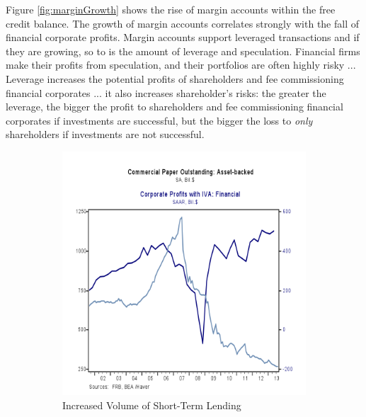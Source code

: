 Figure \ref{fig:marginGrowth} shows the rise of margin accounts within the free credit balance.  The growth of margin accounts correlates strongly with the fall of financial corporate profits.  Margin accounts support leveraged transactions and if they are growing, so to is the amount of leverage and speculation.  Financial firms make their profits from speculation, and their portfolios are often highly risky ... Leverage increases the potential profits of shareholders and fee commissioning financial corporates ... it also increases shareholder's risks: the greater the leverage, the bigger the profit to shareholders and fee commissioning financial corporates if investments are successful, but the bigger the loss to \textit{only} shareholders if investments are not successful.\cite{Dowd}  

 
\begin{figure}[H]
\centering
\begin{subfigure}{.5\textwidth}
  \centering
  \includegraphics[width=1.0\linewidth]{figure/CommPaper_FinProfits.png}
  \caption{Increased Volume of Short-Term Lending}
  \label{fig:shortTermLend}
\end{subfigure}%
\begin{subfigure}{.5\textwidth}
  \centering

\end{subfigure}
\end{figure}
